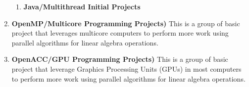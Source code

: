 \documentclass[10pt,fleqn]{article}
\begin{document}
\begin{enumerate}
\begin{enumerate}
      \item {\bf Java/Multithread Initial Projects} 
    \end{enumerate}
  \item {\bf OpenMP/Multicore Programming Projects)} This is a group of basic
        project that leverages multicore computers to perform more work using
        parallel algorithms for linear algebra operations.
  \item {\bf OpenACC/GPU Programming Projects)} This is a group of basic project
        that leverage Graphics Processing Units (GPUs) in most computers to
        perform more work using parallel algorithms for linear algebra
        operations.

\end{enumerate}
\end{document}
